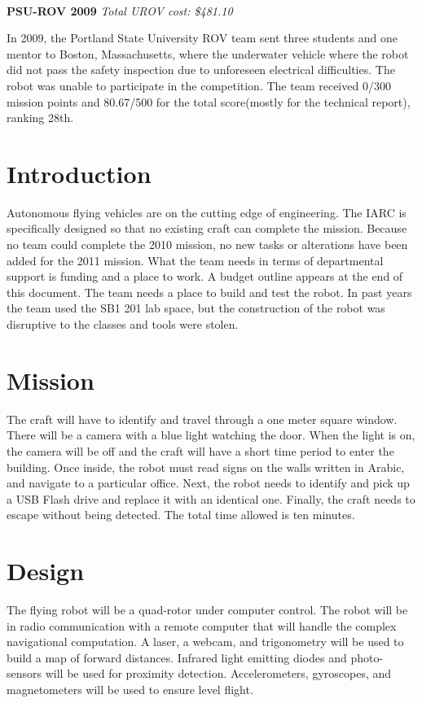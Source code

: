 \documentclass{article}
\begin{document}
\ \\
\noindent
{\bf PSU-ROV 2009}
{\it Total UROV cost: \$481.10}

In 2009, the Portland State University ROV team sent three students and one mentor to Boston, Massachusetts, where the underwater vehicle where the robot did not pass the safety inspection due to unforeseen electrical difficulties. The robot was unable to participate in the competition. The team received 0/300 mission points and 80.67/500 for the total score(mostly for the technical report), ranking 28th. 


\section{Introduction}

Autonomous flying vehicles are on the cutting edge of engineering. The IARC is specifically designed so that no existing craft can complete the mission. Because no team could complete the 2010 mission, no new tasks or alterations have been added for the 2011 mission. What the team needs in terms of departmental support is funding and a place to work. A budget outline appears at the end of this document. The team needs a place to build and test the robot. In past years the team used the SB1 201 lab space, but the construction of the robot was disruptive to the classes and tools were stolen. 

\section{Mission}

The craft will have to identify and travel through a one meter square window. There will be a camera with a blue light watching the door. When the light is on, the camera will be off and the craft will have a short time period to enter the building. Once inside, the robot must read signs on the walls written in Arabic, and navigate to a particular office. Next, the robot needs to identify and pick up a USB Flash drive and replace it with an identical one. Finally, the craft needs to escape without being detected. The total time allowed is ten minutes. 
\section{Design}

The flying robot will be a quad-rotor under computer control. The robot will be in radio communication with a remote computer that will handle the complex navigational computation. A laser, a webcam, and trigonometry will be used to build a map of forward distances. Infrared light emitting diodes and photo-sensors will be used for proximity detection. Accelerometers, gyroscopes, and magnetometers will be used to ensure level flight. 
\end{document}
